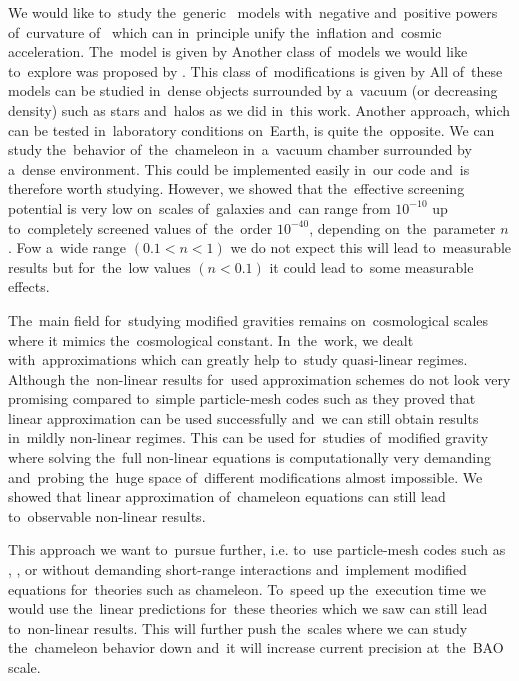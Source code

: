 We would like to~study the~generic \fR\ models with~negative and~positive powers of~curvature of~\textcite{2003PhRvD..68l3512N} which can in~principle unify the~inflation and~cosmic acceleration. The~model is given by
Another class of~models we would like to~explore was proposed by \textcite{2007JETPL..86..157S}. This class of~modifications is given by
All of~these models can be studied in~dense objects surrounded by a~vacuum (or decreasing density) such as stars and~halos as we did in~this work. Another approach, which can be tested in~laboratory conditions on~Earth, is quite the~opposite. We can study the~behavior of~the~chameleon in~a~vacuum chamber surrounded by a~dense environment. This could be implemented easily in~our code and~is therefore worth studying. However, we showed that the~effective screening potential is very low on~scales of~galaxies and~can range from $10^{-10}$ up to~completely screened values of~the~order $10^{-40}$, depending on~the~parameter $n$. Fow a~wide range $(0.1 < n < 1)$ we do not expect this will lead to~measurable results but for~the~low values $(n < 0.1)$ it could lead to~some measurable effects.

The~main field for~studying modified gravities remains on~cosmological scales where it mimics the~cosmological constant. In~the~work, we dealt with~approximations which can greatly help to~study quasi-linear regimes. Although the~non-linear results for~used approximation schemes do not look very promising compared to~simple particle-mesh codes such as  they proved that linear approximation can be used successfully and~we can still obtain results in~mildly non-linear regimes. This can be used for~studies of~modified gravity where solving the~full non-linear equations is computationally very demanding and~probing the~huge space of~different modifications almost impossible. We showed that linear approximation of~chameleon equations can still lead to~observable non-linear results.

This approach we want to~pursue further, i.e. to~use particle-mesh codes such as , , or  without demanding short-range interactions and~implement modified equations for~theories such as chameleon. To~speed up the~execution time we would use the~linear predictions for~these theories which we saw can still lead to~non-linear results. This will further push the~scales where we can study the~chameleon behavior down and~it will increase current precision at~the~BAO scale.

